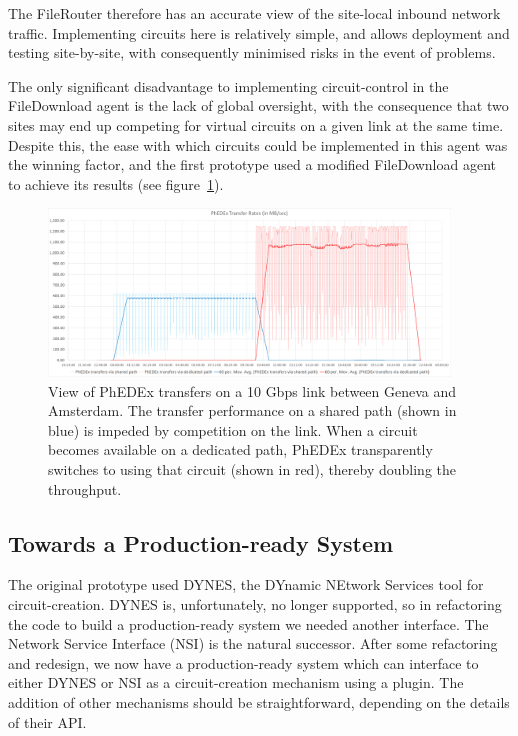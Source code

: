 The FileRouter therefore has an accurate view of the site-local inbound network traffic. Implementing circuits here is relatively simple, and allows deployment and testing site-by-site, with consequently minimised risks in the event of problems.

The only significant disadvantage to implementing circuit-control in the FileDownload agent is the lack of global oversight, with the consequence that two sites may end up competing for virtual circuits on a given link at the same time. Despite this, the ease with which circuits could be implemented in this agent was the winning factor, and the first prototype used a modified FileDownload agent to achieve its results (see figure~\ref{fig:combined_phedex_transfers}).

\begin{figure}[h]
  \centering
  \includegraphics[width=0.95\textwidth]{figure-FileDownload_All_paths}
  \caption{View of PhEDEx transfers on a 10 Gbps link between Geneva and Amsterdam. The transfer performance on a shared path (shown in blue) is impeded by competition on the link. When a circuit becomes available on a dedicated path, PhEDEx transparently switches to using that circuit (shown in red), thereby doubling the throughput.}
  \label{fig:combined_phedex_transfers}
\end{figure}

\subsection{Towards a Production-ready System}

The original prototype used DYNES\cite{DYNES}, the DYnamic NEtwork Services tool for circuit-creation. DYNES is, unfortunately, no longer supported, so in refactoring the code to build a production-ready system we needed another interface. The Network Service Interface (NSI\cite{NSI}) is the natural successor. After some refactoring and redesign, we now have a production-ready system which can interface to either DYNES or NSI as a circuit-creation mechanism using a plugin. The addition of other mechanisms should be straightforward, depending on the details of their API.